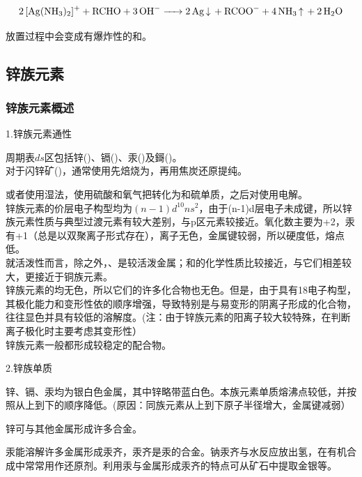\documentclass[a4paper,UTF8]{article}
\begin{document}
$$ \ce{2[Ag(NH3)2]+ + RCHO + 3OH- -> 2Ag\ce{v} + RCOO- + 4NH3\ce{^} + 2H2O} $$

放置过程中会变成有爆炸性的和。

\subsection{锌族元素}

\subsubsection{锌族元素概述}

1.锌族元素通性

周期表$ds$区包括锌()、镉()、汞()及鎶()。\\

对于闪锌矿()，通常使用先焙烧为，再用焦炭还原提纯。

或者使用湿法，使用硫酸和氧气把转化为和硫单质，之后对使用电解。\\

锌族元素的价层电子构型均为$(n-1)d^{10}ns^{2}$，由于(n-1)d层电子未成键，所以锌族元素性质与典型过渡元素有较大差别，与p区元素较接近。氧化数主要为+2，汞有+1（总是以双聚离子形式存在），离子无色，金属键较弱，所以硬度低，熔点低。\\

就活泼性而言，除之外，、是较活泼金属；和的化学性质比较接近，与它们相差较大，更接近于铜族元素。\\

锌族元素的均无色，所以它们的许多化合物也无色。但是，由于具有18电子构型，其极化能力和变形性依的顺序增强，导致特别是与易变形的阴离子形成的化合物，往往显色并具有较低的溶解度。(注：由于锌族元素的阳离子较大较特殊，在判断离子极化时主要考虑其变形性）\\

锌族元素一般都形成较稳定的配合物。

2.锌族单质

锌、镉、汞均为银白色金属，其中锌略带蓝白色。本族元素单质熔沸点较低，并按照从上到下的顺序降低。(原因：同族元素从上到下原子半径增大，金属键减弱）

锌可与其他金属形成许多合金。

汞能溶解许多金属形成汞齐，汞齐是汞的合金。钠汞齐与水反应放出氢，在有机合成中常常用作还原剂。利用汞与金属形成汞齐的特点可从矿石中提取金银等。
\end{document}
